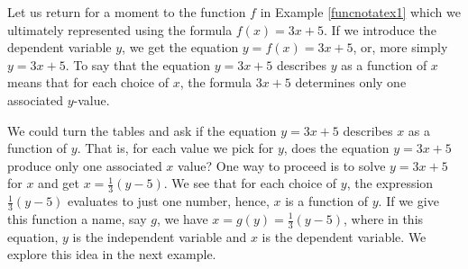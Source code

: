 \documentclass{ximera}
\begin{document}
Let us return for a moment to the function $f$  in Example \ref{funcnotatex1} which we ultimately represented using the formula  $f(x) = 3x+5$.  If we introduce the dependent variable $y$, we get the equation  $y = f(x) = 3x + 5$, or, more simply $y = 3x + 5$.  To say that the equation  $y = 3x + 5$ describes $y$ as a function of $x$ means that for each choice of $x$, the formula $3x + 5$ determines only one associated $y$-value.  

We could turn the tables and ask if the equation $y=3x+5$ describes $x$ as a function of $y$.  That is, for each value we pick for  $y$,  does the equation $y = 3x+5$ produce only one associated $x$ value?  One way to proceed is to solve $y = 3x+5$ for $x$ and get $x= \frac{1}{3} (y-5)$.  We see that for each choice of $y$, the expression $\frac{1}{3} (y-5)$ evaluates to just one number, hence, $x$ is a function of $y$.  If we give this function a name, say $g$, we have $x = g(y) = \frac{1}{3}(y-5)$, where in this equation, $y$ is the independent variable and $x$ is the dependent variable.  We explore this idea in the next example.
\end{document}
